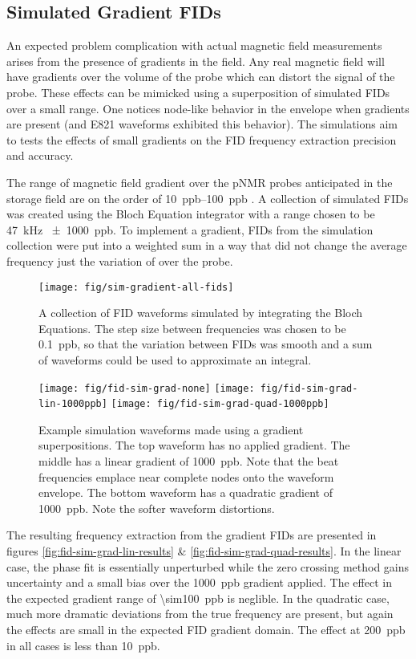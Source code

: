 \subsection{Simulated Gradient FIDs}
An expected problem complication with actual magnetic field measurements arises from the presence of gradients in the field.  Any real magnetic field will have gradients over the volume of the probe which can distort the signal of the probe.  These effects can be mimicked using a superposition of simulated FIDs over a small range.  One notices node-like behavior in the envelope when gradients are present (and E821 waveforms exhibited this behavior).  The simulations aim to tests the effects of small gradients on the FID frequency extraction precision and accuracy.

The range of magnetic field gradient over the pNMR probes anticipated in the \gmtwo storage field are on the order of \SIrange{10}{100}{ppb} . A collection of simulated FIDs was created using the Bloch Equation integrator with a range chosen to be \SI{47}{\kHz} \SI{\pm 1000}{ppb}. To implement a gradient, FIDs from the simulation collection were put into a weighted sum in a way that did not change the average frequency just the variation of over the probe.

\begin{figure}
\label{fig:sim-gradient-all-fids}
\texttt{[image: fig/sim-gradient-all-fids]}
\caption{A collection of FID waveforms simulated by integrating the Bloch Equations.  The step size between frequencies was chosen to be \SI{0.1}{ppb}, so that the variation between FIDs was smooth and a sum of waveforms could be used to approximate an integral.}
\end{figure}

\begin{figure}
\label{fig:fid-sim-grad}
\texttt{[image: fig/fid-sim-grad-none]}
\texttt{[image: fig/fid-sim-grad-lin-1000ppb]}
\texttt{[image: fig/fid-sim-grad-quad-1000ppb]}
\caption{Example simulation waveforms made using a gradient superpositions.  The top waveform has no applied gradient.  The middle has a linear gradient of \SI{1000}{ppb}.  Note that the beat frequencies emplace near complete nodes onto the waveform envelope.  The bottom waveform has a quadratic gradient of \SI{1000}{ppb}.  Note the softer waveform distortions.}
\end{figure}

The resulting frequency extraction from the gradient FIDs are presented in figures \ref{fig:fid-sim-grad-lin-results} \& \ref{fig:fid-sim-grad-quad-results}.  In the linear case, the phase fit is essentially unperturbed while the zero crossing method gains uncertainty and a small bias over the \SI{1000}{ppb} gradient applied.  The effect in the expected gradient range of \SI{\sim100}{ppb} is neglible.  In the quadratic case, much more dramatic deviations from the true frequency are present, but again the effects are small in the expected FID gradient domain.  The effect at \SI{200}{ppb} in all cases is less than \SI{10}{ppb}. 

